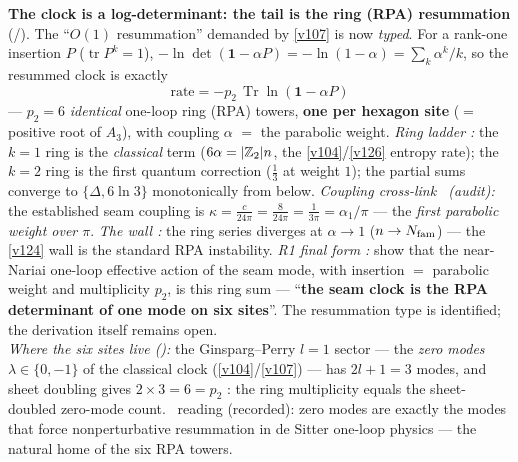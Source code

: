 \par\smallskip\noindent\textbf{The clock is a log-determinant: the tail is the ring (RPA) resummation} (\mE/\mC).
The ``$O(1)$ resummation'' demanded by \vref{v107} is now \emph{typed}. For a rank-one insertion $P$
($\operatorname{tr}P^k=1$), $-\ln\det(\mathbf1-\alpha P)=-\ln(1-\alpha)=\sum_k\alpha^k/k$, so the
resummed clock is exactly
\[
  \boxed{\ \mathrm{rate}=-p_2\,\operatorname{Tr}\ln(\mathbf1-\alpha P)\ }
\]
--- $p_2=6$ \emph{identical} one-loop ring (RPA) towers, \textbf{one per hexagon site} ($=$ positive
root of $A_3$), with coupling $\alpha$ $=$ the parabolic weight. \emph{Ring ladder \mE:} the $k{=}1$
ring is the \emph{classical} term ($6\alpha=|\mathbb{Z}_2|n$, the \vref{v104}/\vref{v126} entropy rate); the $k{=}2$ ring is
the first quantum correction ($\tfrac13$ at weight $1$); the partial sums converge to
$\{\Delta,6\ln3\}$ monotonically from below. \emph{Coupling cross-link \mE\ (audit):} the established
seam coupling is $\kappa=\tfrac c{24\pi}=\tfrac8{24\pi}=\tfrac1{3\pi}=\alpha_1/\pi$ --- the
\emph{first parabolic weight over $\pi$}. \emph{The wall \mE:} the ring series diverges at
$\alpha\to1$ ($n\to N_{\mathrm{fam}}$) --- the \vref{v124} wall is the standard RPA instability. \emph{R1 final form
\mC:} show that the near-Nariai one-loop effective action of the seam mode, with insertion $=$
parabolic weight and multiplicity $p_2$, is this ring sum --- ``\textbf{the seam clock is the RPA
determinant of one mode on six sites}''. The resummation type is identified; the derivation itself
remains open.
\smallskip\\
\noindent\emph{Where the six sites live ():} the Ginsparg--Perry $l=1$
sector --- the \emph{zero modes} $\lambda\in\{0,-1\}$ of the classical clock (\vref{v104}/\vref{v107}) --- has
$2l+1=3$ modes, and sheet doubling gives $2\times3=6=p_2$ \mE: the ring multiplicity equals the
sheet-doubled zero-mode count. \mC\ reading (recorded): zero modes are exactly the modes that force
nonperturbative resummation in de Sitter one-loop physics --- the natural home of the six RPA towers. 


